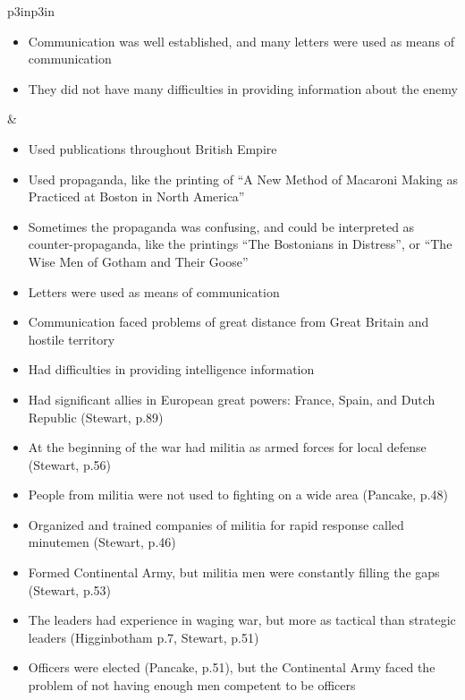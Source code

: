 \begin{singlespace}
\begin{mpxtabular}{p{3in}p{3in}}
\begin{itemize}[nolistsep,leftmargin=*]
	    \item  Communication was well established, and many letters were
	      used as means of communication \cite[167,264]{knollenberg_growth_2003}
	    \item  They did not have many difficulties in providing information
	      about the enemy \cite[63]{ladenburg_causes_1989}
	\end{itemize}
	&
	\begin{itemize}[nolistsep,leftmargin=*]
	    \item  Used publications throughout British Empire
	    \item  Used propaganda, like the printing of  “A New Method of
	      Macaroni Making as Practiced at Boston in North America”
	    \item  Sometimes the propaganda was confusing, and could be
	      interpreted as counter-propaganda, like the printings “The
	      Bostonians in Distress”, or “The Wise Men of Gotham and Their
	      Goose” \cite[168-169]{knollenberg_growth_2003}
	    \item  Letters were used as means of communication \cite[169]{knollenberg_growth_2003}
	    \item  Communication faced problems of great distance from Great Britain and hostile territory
	    \item  Had difficulties in providing intelligence information \cite[545]{mackesy1962british}
	\end{itemize}\ML
	\ML
	\begin{itemize}[nolistsep,leftmargin=*]
	    \item  Had significant allies in European great powers: France, Spain, and Dutch Republic (Stewart, p.89) 
	    \item  At the beginning of the war had militia as armed forces for local defense (Stewart, p.56) 
	    \item  People from militia were not used to fighting on a wide area (Pancake, p.48) 
	    \item  Organized and trained companies of militia for rapid response called minutemen (Stewart, p.46) 
	    \item  Formed Continental Army, but militia men were constantly filling the gaps (Stewart, p.53) 
	    \item  The leaders had experience in waging war, but more as tactical than strategic leaders (Higginbotham p.7, Stewart, p.51) 
	    \item  Officers were elected (Pancake, p.51), but the Continental Army faced the problem of not having enough men competent to be officers 

\end{itemize}
\end{mpxtabular}
\end{singlespace}
